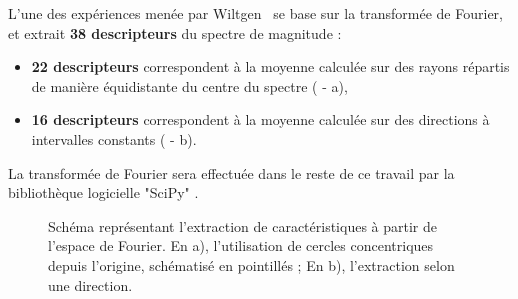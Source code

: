 L'une des expériences menée par Wiltgen~\cite{Wiltgen2008} se base sur la transformée de Fourier, et extrait \textbf{38 descripteurs} du spectre de magnitude :
\begin{itemize}
    \item \textbf{22 descripteurs} correspondent à la moyenne calculée sur des rayons répartis de manière équidistante du centre du spectre ( - a),
    \item \textbf{16 descripteurs} correspondent à la moyenne calculée sur des directions à intervalles constants ( - b).
\end{itemize}
La transformée de Fourier sera effectuée dans le reste de ce travail par la bibliothèque logicielle "SciPy" \cite{Virtanen2020}.\par

\begin{figure}[h]
    \begin{center}
        \qquad
    \end{center}
    \caption{Schéma représentant l'extraction de caractéristiques à partir de l'espace de Fourier. En a), l'utilisation de cercles concentriques depuis l'origine, schématisé en pointillés ; En b), l'extraction selon une direction.}
    \label{fig:scheme_fourier_features}
\end{figure}\par

